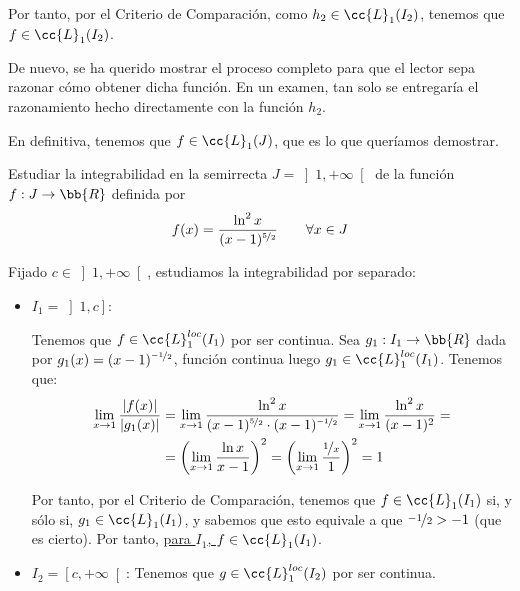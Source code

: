 \begin{ejercicio}
\begin{itemize}
        Por tanto, por el Criterio de Comparación, como $h_2\in \cc{L}_1(I_2)$, tenemos que $f\in \cc{L}_1(I_2)$.
        \begin{observacion}
            De nuevo, se ha querido mostrar el proceso completo para que el lector sepa razonar cómo obtener dicha función.
            En un examen, tan solo se entregaría el razonamiento hecho directamente con la función $h_2$.
        \end{observacion}
    \end{itemize}
    En definitiva, tenemos que $f\in \cc{L}_1(J)$, que es lo que queríamos demostrar.
\end{ejercicio}

\begin{ejercicio} Estudiar la integrabilidad
    en la semirrecta $J=\left]1,+\infty\right[$ de la función $f:J\to \bb{R}$ definida por
    \begin{equation*}
        f(x) = \frac{\ln^2 x}{(x-1)^{\nicefrac{5}{2}}}       \qquad \forall x\in J
    \end{equation*}


    Fijado $c\in \left]1,+\infty\right[$, estudiamos la integrabilidad por separado:
    \begin{itemize}
        \item \underline{$I_1 = \left]1, c\right]$}:
        
            Tenemos que $f\in \cc{L}_1^{loc}(I_1)$ por ser continua.
            Sea $g_1:I_1\to \bb{R}$ dada por $g_1(x)=(x-1)^{\nicefrac{-1}{2}}$, función continua luego $g_1\in \cc{L}_1^{loc}(I_1)$.
            Tenemos que:
            \begin{align*}
                \lim_{x\to 1} \dfrac{|f(x)|}{|g_1(x)|}
                &= \lim_{x\to 1} \dfrac{\ln^2 x}{(x-1)^{\nicefrac{5}{2}}\cdot (x-1)^{\nicefrac{-1}{2}}}
                = \lim_{x\to 1} \dfrac{\ln^2 x}{(x-1)^2}
                =\\&= \left(\lim_{x\to 1} \dfrac{\ln x}{x-1}\right)^2
                = \left(\lim_{x\to 1} \dfrac{\nicefrac{1}{x}}{1}\right)^2 = 1
            \end{align*}

            Por tanto, por el Criterio de Comparación, tenemos que $f\in \cc{L}_1(I_1)$ si, y sólo si, $g_1\in \cc{L}_1(I_1)$, y sabemos que esto equivale a que $\nicefrac{-1}{2}>-1$ (que es cierto). Por tanto, \ul{para $I_1$, $f\in \cc{L}_1(I_1)$}.


        \item \underline{$I_2 = \left[c, +\infty\right[$}: Tenemos que $g\in \cc{L}_1^{loc}(I_2)$ por ser continua.
        

\end{itemize}
\end{ejercicio}

